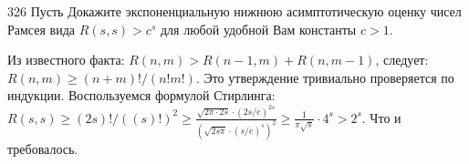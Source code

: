 \begin{task}{326}
Пусть 
Докажите экспоненциальную нижнюю асимптотическую оценку чисел Рамсея вида $R(s,s)>c^s$ для любой удобной Вам константы $c>1$.
\end{task}

\begin{solution}
Из известного факта: $R(n, m) > R(n-1, m) + R(n, m-1)$, следует: $R(n, m) \ge (n+m)!/(n!m!)$. Это утверждение тривиально проверяется по индукции. Воспользуемся формулой Стирлинга: $R(s, s) \ge (2s)!/((s)!)^2 \ge \frac{\sqrt{2\pi\cdot2s}\cdot(2s/e)^{2s}}{(\sqrt{2s\pi}\cdot(s/e)^{s})^2} \ge \frac{1}{\pi\sqrt{s}}\cdot4^s > 2^s$. Что и требовалось.

\end{solution}